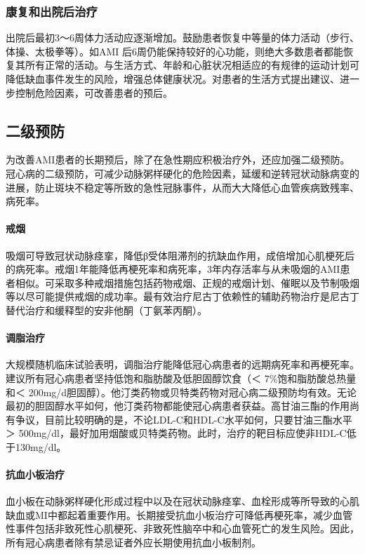 \subsubsection{康复和出院后治疗}

出院后最初3～6周体力活动应逐渐增加。鼓励患者恢复中等量的体力活动（步行、体操、太极拳等）。如AMI
后6周仍能保持较好的心功能，则绝大多数患者都能恢复其所有正常的活动。与生活方式、年龄和心脏状况相适应的有规律的运动计划可降低缺血事件发生的风险，增强总体健康状况。对患者的生活方式提出建议、进一步控制危险因素，可改善患者的预后。

\subsection{二级预防}

为改善AMI患者的长期预后，除了在急性期应积极治疗外，还应加强二级预防。冠心病的二级预防，可减少动脉粥样硬化的危险因素，延缓和逆转冠状动脉病变的进展，防止斑块不稳定等所致的急性冠脉事件，从而大大降低心血管疾病致残率、病死率。

\paragraph{戒烟}

吸烟可导致冠状动脉痉挛，降低β受体阻滞剂的抗缺血作用，成倍增加心肌梗死后的病死率。戒烟1年能降低再梗死率和病死率，3年内存活率与从未吸烟的AMI患者相似。可采取多种戒烟措施包括药物戒烟、正规的戒烟计划、催眠以及节制吸烟等以尽可能提供戒烟的成功率。最有效治疗尼古丁依赖性的辅助药物治疗是尼古丁替代治疗和缓释型的安非他酮（丁氨苯丙酮）。

\paragraph{调脂治疗}

大规模随机临床试验表明，调脂治疗能降低冠心病患者的远期病死率和再梗死率。建议所有冠心病患者坚持低饱和脂肪酸及低胆固醇饮食（＜
7\%饱和脂肪酸总热量和＜
200mg/d胆固醇）。他汀类药物或贝特类药物对冠心病二级预防均有效。无论最初的胆固醇水平如何，他汀类药物都能使冠心病患者获益。高甘油三酯的作用尚有争议，目前比较明确的是，不论LDL-C和HDL-C水平如何，只要甘油三酯水平＞
500mg/dl，最好加用烟酸或贝特类药物。此时，治疗的靶目标应使非HDL-C低于130mg/dl。

\paragraph{抗血小板治疗}

血小板在动脉粥样硬化形成过程中以及在冠状动脉痉挛、血栓形成等所导致的心肌缺血或MI中都起着重要作用。长期接受抗血小板治疗可降低再梗死率，减少血管性事件包括非致死性心肌梗死、非致死性脑卒中和心血管死亡的发生风险。因此，所有冠心病患者除有禁忌证者外应长期使用抗血小板制剂。

